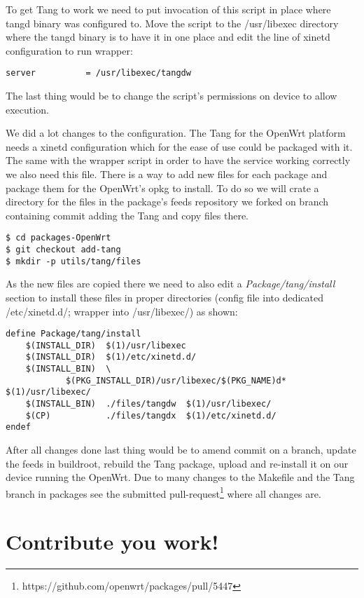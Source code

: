 To get Tang to work we need to put invocation of this script in place where tangd binary was configured to.
Move the script to the /usr/libexec directory where the tangd binary is to have it in one place and edit the line of xinetd configuration to run wrapper:
\begin{lstlisting}[columns=fixed,basicstyle=\ttfamily\footnotesize,tabsize=4,backgroundcolor=\color{yellow!10}]
    server          = /usr/libexec/tangdw
\end{lstlisting}
The last thing would be to change the script's permissions on device to allow execution.

We did a lot changes to the configuration.
The Tang for the OpenWrt platform needs a xinetd configuration which for the ease of use could be packaged with it.
The same with the wrapper script in order to have the service working correctly we also need this file.
There is a way to add new files for each package and package them for the OpenWrt's opkg to install.
To do so we will crate a directory for the files in the package's feeds repository we forked on branch containing commit adding the Tang and copy files there.
\begin{lstlisting}[columns=fixed,basicstyle=\ttfamily\footnotesize,tabsize=4,backgroundcolor=\color{yellow!10}]
$ cd packages-OpenWrt
$ git checkout add-tang
$ mkdir -p utils/tang/files
\end{lstlisting}
As the new files are copied there we need to also edit a {\it Package/tang/install} section to install these files in proper directories (config file into dedicated /etc/xinetd.d/; wrapper into /usr/libexec/) as shown:
\begin{lstlisting}[columns=fixed,basicstyle=\ttfamily\footnotesize,tabsize=4,backgroundcolor=\color{yellow!10}]
define Package/tang/install
	$(INSTALL_DIR)	$(1)/usr/libexec
	$(INSTALL_DIR)	$(1)/etc/xinetd.d/
	$(INSTALL_BIN)	\
			$(PKG_INSTALL_DIR)/usr/libexec/$(PKG_NAME)d*	$(1)/usr/libexec/
	$(INSTALL_BIN)	./files/tangdw	$(1)/usr/libexec/
	$(CP)			./files/tangdx	$(1)/etc/xinetd.d/
endef
\end{lstlisting}
After all changes done last thing would be to amend commit on a branch, update the feeds in buildroot, rebuild the Tang package, upload and re-install it on our device running the OpenWrt.
Due to many changes to the Makefile and the Tang branch in packages see the submitted pull-request\footnote{https://github.com/openwrt/packages/pull/5447} where all changes are.


\section{Contribute you work!}

